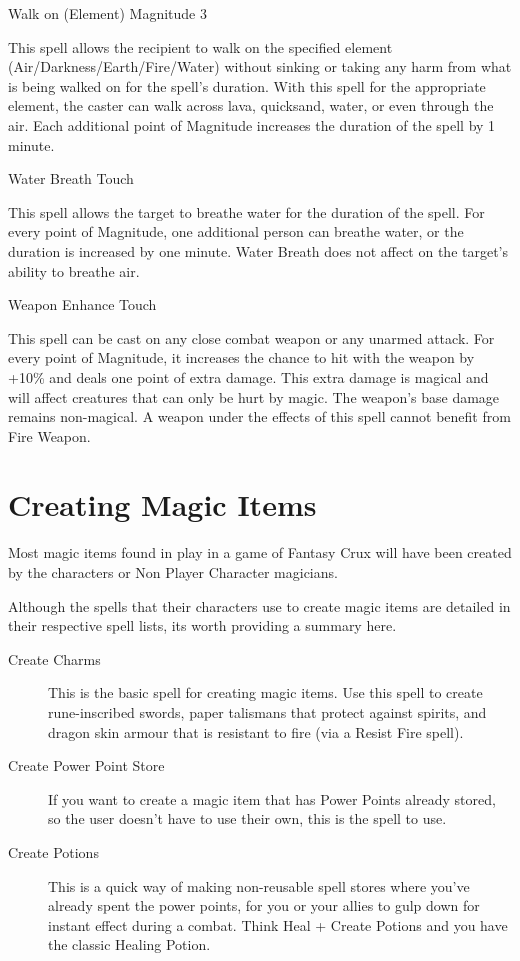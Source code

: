 \begin{rpg-spell}
{Walk on (Element)}
{Magnitude 3}

This spell allows the recipient to walk on the specified element (Air/Darkness/Earth/Fire/Water) without sinking or taking any harm from what is being walked on for the spell’s duration. With this spell for the appropriate element, the caster can walk across lava, quicksand, water, or even through the air. Each additional point of Magnitude increases the duration of the spell by 1 minute.
\end{rpg-spell}


\begin{rpg-spell}
{Water Breath}
{Touch}

This spell allows the target to breathe water for the duration of the spell. For every point of Magnitude, one additional person can breathe water, or the duration is increased by one minute. Water Breath does not affect on the target’s ability to breathe air.
\end{rpg-spell}


\begin{rpg-spell}
{Weapon Enhance}
{Touch}

This spell can be cast on any close combat weapon or any unarmed attack. For every point of Magnitude, it increases the chance to hit with the weapon by +10\% and deals one point of extra damage. This extra damage is magical and will affect creatures that can only be hurt by magic. The weapon’s base damage remains non-magical. A weapon under the effects of this spell cannot benefit from Fire Weapon.
\end{rpg-spell}


\section{Creating Magic Items}

Most magic items found in play in a game of Fantasy Crux will have been created by the characters or Non Player Character magicians.

Although the spells that their characters use to create magic items are detailed in their respective spell lists, its worth providing a summary here.

\begin{description}
\item [Create Charms] This is the basic spell for creating magic items. Use this spell to create rune-inscribed swords, paper talismans that protect against spirits, and dragon skin armour that is resistant to fire (via a Resist Fire spell).
\item [Create Power Point Store] If you want to create a magic item that has Power Points already stored, so the user doesn’t have to use their own, this is the spell to use.
\item [Create Potions] This is a quick way of making non-reusable spell stores where you’ve already spent the power points, for you or your allies to gulp down for instant effect during a combat. Think Heal + Create Potions and you have the classic Healing Potion.
\end{description}

